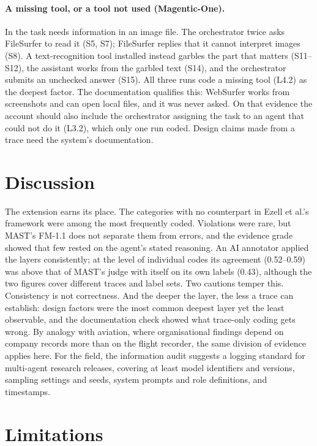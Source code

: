 \documentclass[11pt]{article}
\begin{document}
\paragraph{A missing tool, or a tool not used (Magentic-One).} In
 the task needs information in an image file. The
orchestrator twice asks FileSurfer to read it (S5, S7); FileSurfer replies that it
cannot interpret images (S8). A text-recognition tool installed instead garbles the
part that matters (S11--S12), the assistant works from the garbled text (S14), and
the orchestrator submits an unchecked answer (S15). All three runs code a missing
tool (L4.2) as the deepest factor. The documentation qualifies this: WebSurfer
works from screenshots and can open local files, and it was never asked. On that
evidence the account should also include the orchestrator assigning the task to an
agent that could not do it (L3.2), which only one run coded. Design claims made
from a trace need the system's documentation.

\fussy
\section{Discussion}

The extension earns its place. The categories with no counterpart in Ezell et
al.'s framework were among the most frequently coded. Violations were rare, but
MAST's FM-1.1 does not separate them from errors, and the evidence grade showed that
few rested on the agent's stated reasoning. An AI annotator applied the layers
consistently; at the level of individual codes its agreement (0.52--0.59) was above
that of MAST's judge with itself on its own labels (0.43), although the two figures
cover different traces and label sets. Two cautions
temper this. Consistency is not correctness. And the deeper the layer, the less a
trace can establish: design factors were the most common deepest layer yet the
least observable, and the documentation check showed what trace-only coding gets
wrong. By analogy with aviation, where organisational findings depend on company
records more than on the flight recorder, the same division of evidence applies
here. For the field,
the information audit suggests a logging standard for multi-agent research
releases, covering at least model identifiers and versions, sampling settings and
seeds, system prompts and role definitions, and timestamps.

\section{Limitations}
\end{document}
